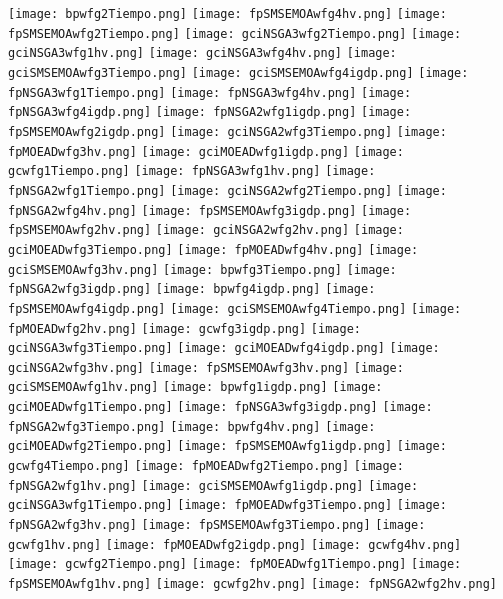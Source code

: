 \documentclass{article}
\begin{document}
	\texttt{[image: bpwfg2Tiempo.png]}
	\texttt{[image: fpSMSEMOAwfg4hv.png]}
	\texttt{[image: fpSMSEMOAwfg2Tiempo.png]}
	\texttt{[image: gciNSGA3wfg2Tiempo.png]}
	\texttt{[image: gciNSGA3wfg1hv.png]}
	\texttt{[image: gciNSGA3wfg4hv.png]}
	\texttt{[image: gciSMSEMOAwfg3Tiempo.png]}
	\texttt{[image: gciSMSEMOAwfg4igdp.png]}
	\texttt{[image: fpNSGA3wfg1Tiempo.png]}
	\texttt{[image: fpNSGA3wfg4hv.png]}
	\texttt{[image: fpNSGA3wfg4igdp.png]}
	\texttt{[image: fpNSGA2wfg1igdp.png]}
	\texttt{[image: fpSMSEMOAwfg2igdp.png]}
	\texttt{[image: gciNSGA2wfg3Tiempo.png]}
	\texttt{[image: fpMOEADwfg3hv.png]}
	\texttt{[image: gciMOEADwfg1igdp.png]}
	\texttt{[image: gcwfg1Tiempo.png]}
	\texttt{[image: fpNSGA3wfg1hv.png]}
	\texttt{[image: fpNSGA2wfg1Tiempo.png]}
	\texttt{[image: gciNSGA2wfg2Tiempo.png]}
	\texttt{[image: fpNSGA2wfg4hv.png]}
	\texttt{[image: fpSMSEMOAwfg3igdp.png]}
	\texttt{[image: fpSMSEMOAwfg2hv.png]}
	\texttt{[image: gciNSGA2wfg2hv.png]}
	\texttt{[image: gciMOEADwfg3Tiempo.png]}
	\texttt{[image: fpMOEADwfg4hv.png]}
	\texttt{[image: gciSMSEMOAwfg3hv.png]}
	\texttt{[image: bpwfg3Tiempo.png]}
	\texttt{[image: fpNSGA2wfg3igdp.png]}
	\texttt{[image: bpwfg4igdp.png]}
	\texttt{[image: fpSMSEMOAwfg4igdp.png]}
	\texttt{[image: gciSMSEMOAwfg4Tiempo.png]}
	\texttt{[image: fpMOEADwfg2hv.png]}
	\texttt{[image: gcwfg3igdp.png]}
	\texttt{[image: gciNSGA3wfg3Tiempo.png]}
	\texttt{[image: gciMOEADwfg4igdp.png]}
	\texttt{[image: gciNSGA2wfg3hv.png]}
	\texttt{[image: fpSMSEMOAwfg3hv.png]}
	\texttt{[image: gciSMSEMOAwfg1hv.png]}
	\texttt{[image: bpwfg1igdp.png]}
	\texttt{[image: gciMOEADwfg1Tiempo.png]}
	\texttt{[image: fpNSGA3wfg3igdp.png]}
	\texttt{[image: fpNSGA2wfg3Tiempo.png]}
	\texttt{[image: bpwfg4hv.png]}
	\texttt{[image: gciMOEADwfg2Tiempo.png]}
	\texttt{[image: fpSMSEMOAwfg1igdp.png]}
	\texttt{[image: gcwfg4Tiempo.png]}
	\texttt{[image: fpMOEADwfg2Tiempo.png]}
	\texttt{[image: fpNSGA2wfg1hv.png]}
	\texttt{[image: gciSMSEMOAwfg1igdp.png]}
	\texttt{[image: gciNSGA3wfg1Tiempo.png]}
	\texttt{[image: fpMOEADwfg3Tiempo.png]}
	\texttt{[image: fpNSGA2wfg3hv.png]}
	\texttt{[image: fpSMSEMOAwfg3Tiempo.png]}
	\texttt{[image: gcwfg1hv.png]}
	\texttt{[image: fpMOEADwfg2igdp.png]}
	\texttt{[image: gcwfg4hv.png]}
	\texttt{[image: gcwfg2Tiempo.png]}
	\texttt{[image: fpMOEADwfg1Tiempo.png]}
	\texttt{[image: fpSMSEMOAwfg1hv.png]}
	\texttt{[image: gcwfg2hv.png]}
	\texttt{[image: fpNSGA2wfg2hv.png]}
\end{document}

